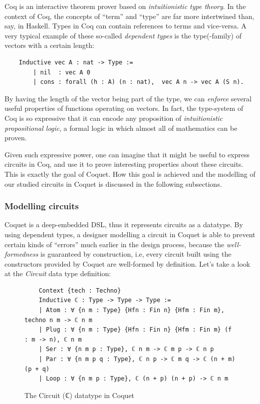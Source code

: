 \documentclass[a4paper]{article}
\begin{document}
            Coq is an interactive theorem prover based on \emph{intuitionistic type theory}. In the
            context of Coq, the concepts of ``term'' and ``type'' are far more intertwined than,
            say, in Haskell. Types in Coq can contain references to terms and vice-versa. A very
            typical example of these so-called \emph{dependent types} is the type(-family) of
            vectors with a certain length:
            \begin{verbatim}
    Inductive vec A : nat -> Type :=
        | nil  : vec A 0
        | cons : forall (h : A) (n : nat),  vec A n -> vec A (S n).
            \end{verbatim}

            By having the length of the vector being part of the type, we can \emph{enforce} several
            useful properties of functions operating on vectors. In fact, the type-system of Coq is
            so expressive that it can encode any proposition of \emph{intuitionistic propositional
                logic}, a formal logic in which almost all of mathematics can be proven.

            Given such expressive power, one can imagine that it might be useful to express circuits
            in Coq, and use it to prove interesting properties about these circuits. This is exactly
            the goal of Coquet. How this goal is achieved and the modelling of our studied circuits
            in Coquet is discussed in the following subsections.

            \subsubsection{Modelling circuits}
            \label{subsubsec:coquet-modelling}
                Coquet is a deep-embedded DSL, thus it represents circuits as a datatype. By using
                dependent types, a designer modelling a circuit in Coquet is able to prevent certain
                kinds of ``errors'' much earlier in the design process, because the
                \emph{well-formedness} is guaranteed by construction, i.e, every circuit built using
                the constructors provided by Coquet are well-formed by definition. Let's take a look
                at the \emph{Circuit} data type definition:
                \begin{figure}[h]
                    \begin{center}
                        \begin{verbatim}
    Context {tech : Techno}
    Inductive ℂ : Type -> Type -> Type :=
    | Atom : ∀ {n m : Type} {Hfn : Fin n} {Hfm : Fin m}, techno n m -> ℂ n m
    | Plug : ∀ {n m : Type} {Hfn : Fin n} {Hfm : Fin m} (f : m -> n), ℂ n m
    | Ser : ∀ {n m p : Type}, ℂ n m -> ℂ m p -> ℂ n p
    | Par : ∀ {n m p q : Type}, ℂ n p -> ℂ m q -> ℂ (n + m) (p + q)
    | Loop : ∀ {n m p : Type}, ℂ (n + p) (n + p) -> ℂ n m
                        \end{verbatim}
                    \end{center}
                    \caption{The Circuit (ℂ) datatype in Coquet
                        \label{fig:coquet-circuit-type}}
                \end{figure}
\end{document}
